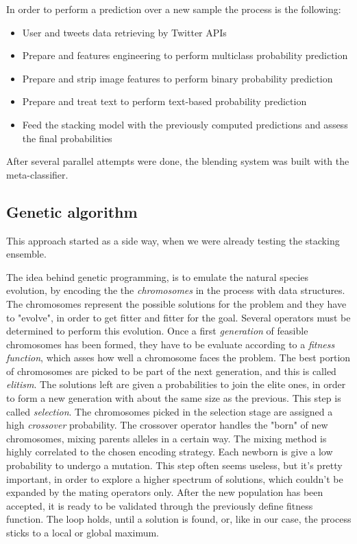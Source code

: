 In order to perform a prediction over a new sample the process is the following:
\begin{itemize}
	\item[\PencilRight]User and tweets data retrieving by Twitter APIs
	\item[\PencilRight]Prepare and features engineering to perform multiclass probability prediction
	\item[\PencilRight]Prepare and strip image features to perform binary probability prediction
	\item[\PencilRight]Prepare and treat text to perform text-based probability prediction
	\item[\PencilRight]Feed the stacking model with the previously computed predictions and assess the final probabilities 
\end{itemize}

After several parallel attempts were done, the blending system was built with the meta-classifier.

\subsection{Genetic algorithm}
This approach started as a side way, when we were already testing the stacking ensemble.

The idea behind genetic programming, is to emulate the natural species evolution, by encoding the the \textit{chromosomes} in the process with data structures.
The chromosomes represent the possible solutions for the problem and they have to "evolve", in order to get fitter and fitter for the goal.
Several operators must be determined to perform this evolution.
Once a first \textit{generation} of feasible chromosomes has been formed, they have to be evaluate according to a \textit{fitness function}, which asses how well a chromosome faces the problem.
The best portion of chromosomes are picked to be part of the next generation, and this is called \textit{elitism}. The solutions left are given a probabilities to join the elite ones, in order to form a new generation with about the same size as the previous. This step is called \textit{selection}.
The chromosomes picked in the selection stage are assigned a high \textit{crossover} probability.
The crossover operator handles the "born" of new chromosomes, mixing parents alleles in a certain way. The mixing method is highly correlated to the chosen encoding strategy.
Each newborn is give a low probability to undergo a mutation. This step often seems useless, but it's pretty important, in order to explore a higher spectrum of solutions, which couldn't be expanded by the mating operators only.
After the new population has been accepted, it is ready to be validated through the previously define fitness function.
The loop holds, until a solution is found, or, like in our case, the process sticks to a local or global maximum.

